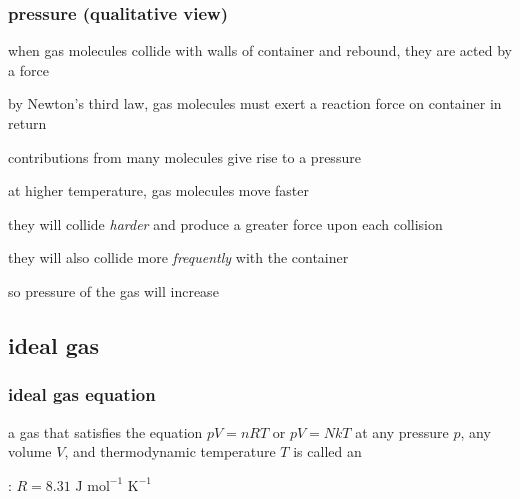 	




\subsubsection{pressure (qualitative view)}

when gas molecules collide with walls of container and rebound, they are acted by a force

by Newton's third law, gas molecules must exert a reaction force on container in return

contributions from many molecules give rise to a pressure


\sol at higher temperature, gas molecules move faster

they will collide \emph{harder} and produce a greater force upon each collision

they will also collide more \emph{frequently} with the container

so pressure of the gas will increase \eoe





\subsection{ideal gas}

\subsubsection{ideal gas equation}

\rcyskip

\begin{ilight}
	a gas that satisfies the equation $\boxed{pV=nRT}$ or $\boxed{pV=NkT}$ at any pressure $p$, any volume $V$, and thermodynamic temperature $T$ is called an 
\end{ilight}

: $R=8.31 \text{ J mol}^{-1}\text{ K}^{-1}$

